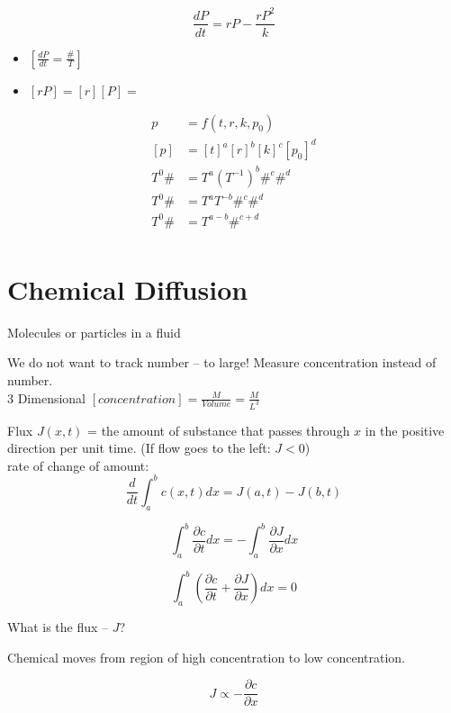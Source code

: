 \documentclass[
	date={August 28{,} 2024}
]{math486notes}
\begin{document}
\[ \frac{dP}{dt} = rP - \frac{rP^{2}}{k} \]
\begin{itemize}
	\item $\left[ \frac{dP}{dt} = \frac{\#}{T} \right]$
	\item $[rP] = [r][P] = $
\end{itemize}

\begin{equation*}
\begin{aligned}
	p &= f(t, r, k, p_{0})\\
	[p] &= [t]^{a}[r]^{b}[k]^{c}[p_{0}]^{d}\\
	T^{0}\# &= T^{a}(T^{-1})^{b}\#^{c}\#^{d}\\
	T^{0}\# &= T^{a}T^{-b}\#^{c}\#^{d}\\
	T^{0}\# &= T^{a-b}\#^{c+d}\\
\end{aligned}
\end{equation*}

\chapter{Chemical Diffusion}\label{ch:chemical-diffusion}
\begin{center}
	Molecules or particles in a fluid
\end{center}

We do not want to track number -- to large!
Measure concentration instead of number.\\

3 Dimensional $[concentration] = \frac{M}{Volume} = \frac{M}{L^{3}}$

Flux $J(x,t)$ = the amount of substance that passes through $x$ in the positive direction per unit time. (If flow goes to the left: $J < 0$)\\

rate of change of amount:
\begin{equation}
	\frac{d}{dt}\int_{a}^{b} c(x,t)dx = J(a,t) - J(b,t)
	\label{eq:flux}
\end{equation}

\begin{equation}
	\int_{a}^{b} \frac{\partial c}{\partial t} dx = -\int_{a}^{b} \frac{\partial J}{\partial x} dx
	\label{eq:what-the-flux}
\end{equation}

\begin{equation}
	\int_{a}^{b} \left( \frac{\partial c}{\partial t} + \frac{\partial J}{\partial x}\right) dx = 0
	\label{eq:flux2}
\end{equation}

What is the flux -- $J$?

Chemical moves from region of high concentration to low concentration.

\begin{equation}
	J \propto -\frac{\partial c}{\partial x}
	\label{eq:Ficks-Law}
\end{equation}
\end{document}
